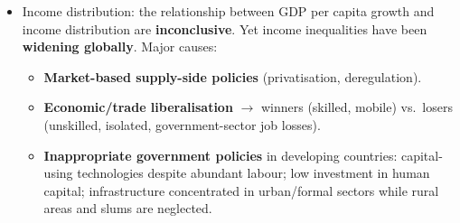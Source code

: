 \documentclass[a4paper,12pt]{article}
\begin{document}
\begin{itemize}
\begin{itemize}
  \item Greater emphasis on \textbf{human capital} (pollution-free) over physical capital.
  \item \textbf{Green investments}: public transport, building insulation, clean technology R\&D.
  \item Structural shifts toward \textbf{services} (less polluting) plus investment in resource protection.
\end{itemize}
However, even under ideal conditions there is a \textbf{maximum sustainable rate of growth}: pursuit of sustainability uses some resources (anti-pollution controls, regulation costs) representing an opportunity cost in terms of slightly lower growth --- but this only affects a portion of very high growth rates.
  \item Income distribution: the relationship between GDP per capita growth and income distribution are \textbf{inconclusive}. Yet income inequalities have been \textbf{widening globally}. Major causes:
\begin{itemize}
  \item \textbf{Market-based supply-side policies} (privatisation, deregulation).
  \item \textbf{Economic/trade liberalisation} $\to$ winners (skilled, mobile) vs.\ losers (unskilled, isolated, government-sector job losses).
  \item \textbf{Inappropriate government policies} in developing countries: capital-using technologies despite abundant labour; low investment in human capital; infrastructure concentrated in urban/formal sectors while rural areas and slums are neglected.
\end{itemize}
\end{itemize}
\end{document}
